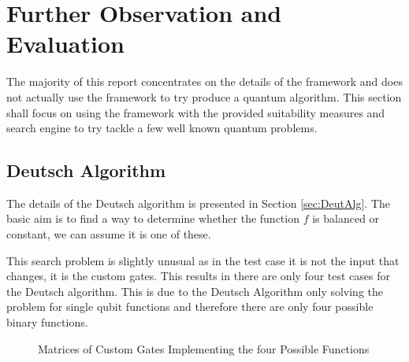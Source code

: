 \chapter{Further Observation and Evaluation}
\label{sec:experimentation}

The majority of this report concentrates on the details of the framework and does not actually use the framework to try produce a quantum algorithm.
This section shall focus on using the framework with the provided suitability measures and search engine to try tackle a few well known quantum problems.

\section{Deutsch Algorithm}
\label{sec:deutschexperiment}
The details of the Deutsch algorithm is presented in Section \ref{sec:DeutAlg}.
The basic aim is to find a way to determine whether the function $f$ is balanced or constant, we can assume it is one of these.

This search problem is slightly unusual as in the test case it is not the input that changes, it is the custom gates.
This results in there are only four test cases for the Deutsch algorithm.
This is due to the Deutsch Algorithm only solving the problem for single qubit functions and therefore there are only four possible binary functions.



\begin{figure}
\centering
{}
\caption{Matrices of Custom Gates Implementing the four Possible Functions}
 \label{fig:deutschfunctions}
\end{figure}

